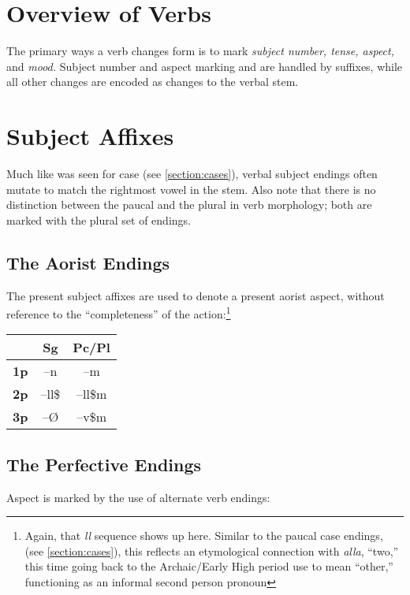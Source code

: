 \documentclass[oneside]{book}
\begin{document}
\section{Overview of Verbs}




The primary ways a verb changes form is to mark \textit{subject number, tense, aspect,} and \textit{mood.} Subject number and aspect marking and are handled by suffixes, while all other changes are encoded as changes to the verbal stem.




\section{Subject Affixes}

Much like was seen for case (see \ref{section:cases}), verbal subject endings often mutate to match the rightmost vowel in the stem. Also note that there is no distinction between the paucal and the plural in verb morphology; both are marked with the plural set of endings.

\subsection{The Aorist Endings}

The present subject affixes are used to denote a present aorist aspect, without reference to the ``completeness'' of the action:\footnote{Again, that \textit{ll} sequence shows up here. Similar to the paucal case endings, (see \ref{section:cases}), this reflects an etymological connection with \textit{alla}, ``two,'' this time going back to the Archaic/Early High period use to mean ``other,'' functioning as an informal second person pronoun}

\begin{center}

\begin{tabular}{c| c c }
  & \textbf{Sg} & \textbf{Pc/Pl} \\
  \hline
  \textbf{1p} & --n & --m \\
  \textbf{2p}& --ll\$ & --ll\$m \\
  \textbf{3p} & --\O & --v\$m

\end{tabular}

\end{center}



\subsection{The Perfective Endings}
Aspect is marked by the use of alternate verb endings:
\end{document}
